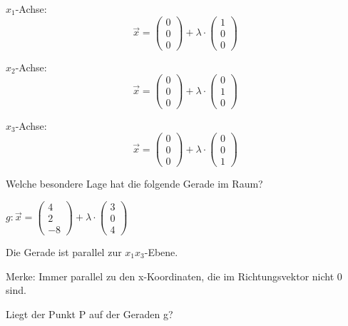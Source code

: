 \begin{antwort}\large
	$x_1$-Achse:
	\[\vec{x}=\left(\begin{array}{c} 0 \\ 0 \\ 0\end{array} \right)+\lambda \cdot \left(\begin{array}{c} 1 \\ 0 \\ 0\end{array} \right)\]
	
	$x_2$-Achse:
	\[\vec{x}=\left(\begin{array}{c} 0 \\ 0 \\ 0\end{array} \right)+\lambda \cdot \left(\begin{array}{c} 0 \\ 1 \\ 0\end{array} \right)\]
	
	$x_3$-Achse:
	\[\vec{x}=\left(\begin{array}{c} 0 \\ 0 \\ 0\end{array} \right)+\lambda \cdot \left(\begin{array}{c} 0 \\ 0 \\ 1\end{array} \right)\]\end{antwort}
\begin{frage}\LARGE
	Welche besondere Lage hat die folgende Gerade im Raum?
	
	$g:\vec{x}=\left(\begin{array}{c} 4 \\ 2 \\ -8\end{array} \right)+\lambda \cdot \left(\begin{array}{c} 3 \\ 0 \\ 4\end{array} \right)$\end{frage}
\begin{antwort}\Large
	Die Gerade ist parallel zur $x_1x_3$-Ebene.
	
	Merke: Immer parallel zu den x-Koordinaten, die im Richtungsvektor nicht 0 sind.\end{antwort}
\begin{frage}\LARGE
	Liegt der Punkt P auf der Geraden g?\end{frage}
